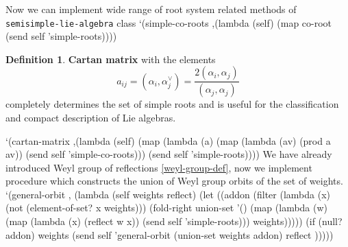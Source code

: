 \documentclass[a4paper,10pt]{article}
\theoremstyle{definition} \newtheorem{Def}{Definition}
\begin{document}
Now we can implement wide range of root system related methods of {\tt{}semisimple-lie-algebra} class
\nwenddocs{}\endmoddef
`(simple-co-roots ,(lambda (self)
              (map co-root (send self 'simple-roots))))
\nwendcode{}\nwdocspar
\begin{Def}
  {\bf Cartan matrix} with the elements
  \begin{equation}
    \label{eq:7}
    a_{ij}=(\alpha_i,\alpha_j^{\vee})=\frac{2(\alpha_i,\alpha_j)}{(\alpha_j,\alpha_j)}
  \end{equation}
  completely determines the set of simple roots and is useful for the classification and compact description of Lie algebras.
\end{Def}
\nwenddocs{}\plusendmoddef
`(cartan-matrix
  ,(lambda (self)
     (map (lambda (a)
            (map (lambda (av) (prod a av)) (send self 'simple-co-roots)))
         (send self 'simple-roots))))
\nwendcode{}\nwdocspar
We have already introduced Weyl group of reflections \ref{weyl-group-def}, now we implement procedure which constructs the union of Weyl group orbits of the set of weights.
\nwenddocs{}\plusendmoddef
`(general-orbit , (lambda (self weights reflect)
    (let ((addon 
           (filter (lambda (x) (not (element-of-set? x weights)))
                   (fold-right union-set '() 
                               (map (lambda (w)
                                      (map
                                       (lambda (x) (reflect w x))
                                       (send self 'simple-roots)))
                                    weights)))))
      (if (null? addon)
          weights
          (send self 'general-orbit (union-set weights addon) reflect )))))
\end{document}
